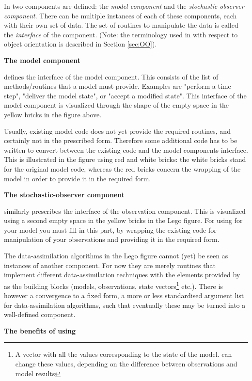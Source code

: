 In \oda two components are defined: the \emph{\oda model component} and the \emph{\oda stochastic-observer component}. There can be multiple instances of each of these components, each with their own set of data. The set of routines to manipulate the data is called the \emph{interface} of the component. (Note: the terminology used in \oda with respect to object orientation is described in Section \ref{sec:OO}).

\textbf{The \oda model component}

\oda defines the interface of the \oda model component. This consists of the list of methods/routines that a model must provide. Examples are "perform a time step", "deliver the model state", or "accept a modified state". This interface of the model component is visualized through the shape of the empty space in the yellow bricks in the figure above.

Usually, existing model code does not yet provide the required routines, and certainly not in the prescribed form. Therefore some additional code has to be written to convert between the existing code and the \oda model-components interface. This is illustrated in the figure using red and white bricks: the white bricks stand for the original model code, whereas the red bricks concern the wrapping of the model in order to provide it in the required form.

\textbf{The \oda stochastic-observer component}

\oda similarly prescribes the interface of the \oda observation component. This is visualized using a second empty space in the yellow bricks in the Lego figure. For using \oda for your model you must fill in this part, by wrapping the existing code for manipulation of your observations and providing it in the required form.

The data-assimilation algorithms in the Lego figure cannot (yet) be seen as instances of another component. For now they are merely routines that implement different data-assimilation techniques with the elements provided by \oda as the building blocks (models, observations, state vectors\footnote{A vector with all the values corresponding to the state of the model. \oda can change these values, depending on the difference between observations and model results} etc.). There is however a convergence to a fixed form, a more or less standardised argument list for data-assimilation algorithms, such that eventually these may be turned into a well-defined component.

\textbf{The benefits of using \oda}

